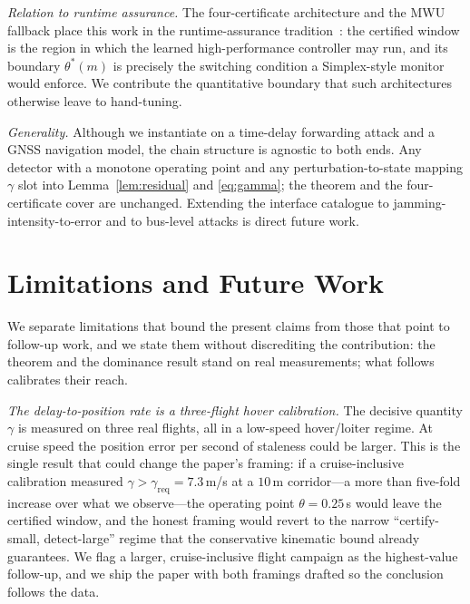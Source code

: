 \documentclass[conference]{IEEEtran}
\begin{document}
\emph{Relation to runtime assurance.} The four-certificate architecture and the
MWU fallback place this work in the runtime-assurance
tradition~\cite{sha2001simplex,mehmood2022blackbox}: the certified window is the
region in which the learned high-performance controller may run, and its
boundary $\theta^{*}(m)$ is precisely the switching condition a Simplex-style
monitor would enforce. We contribute the quantitative boundary that such
architectures otherwise leave to hand-tuning.

\emph{Generality.} Although we instantiate on a time-delay forwarding attack and
a GNSS navigation model, the chain structure is agnostic to both ends. Any
detector with a monotone operating point and any perturbation-to-state mapping
$\gamma$ slot into Lemma~\ref{lem:residual} and \eqref{eq:gamma}; the theorem
and the four-certificate cover are unchanged. Extending the interface catalogue
to jamming-intensity-to-error and to bus-level attacks is direct future work.

\section{Limitations and Future Work}
\label{sec:limitations}
We separate limitations that bound the present claims from those that point to
follow-up work, and we state them without discrediting the contribution: the
theorem and the dominance result stand on real measurements; what follows
calibrates their reach.

\emph{The delay-to-position rate is a three-flight hover calibration.} The
decisive quantity $\gamma$ is measured on three real flights, all in a
low-speed hover/loiter regime. At cruise speed the position error per second of
staleness could be larger. This is the single result that could change the
paper's framing: if a cruise-inclusive calibration measured
$\gamma>\gamma_{\mathrm{req}}=7.3$\,m/s at a $10$\,m corridor---a more than
five-fold increase over what we observe---the operating point $\theta=0.25$\,s
would leave the certified window, and the honest framing would revert to the
narrow ``certify-small, detect-large'' regime that the conservative kinematic
bound already guarantees. We flag a larger, cruise-inclusive flight campaign as
the highest-value follow-up, and we ship the paper with both framings drafted so
the conclusion follows the data.
\end{document}
